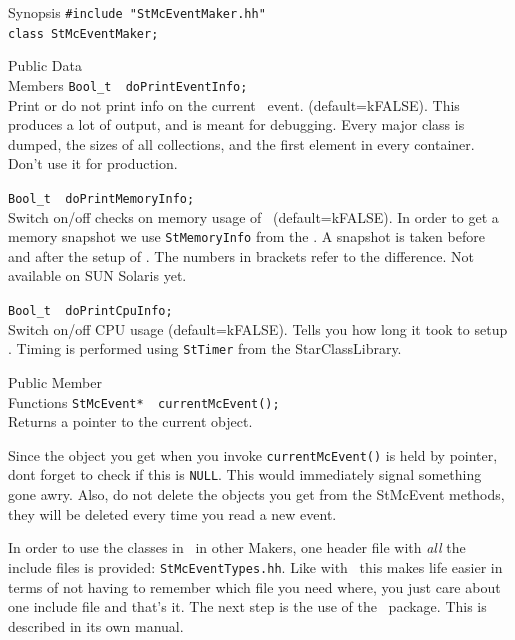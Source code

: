 \label{sec:StMcEventMaker}
\begin{Entry}
\item[Synopsis]
    \verb+#include "StMcEventMaker.hh"+\\
    \verb+class StMcEventMaker;+\\

\item[Public Data\\ Members]
    \verb+Bool_t  doPrintEventInfo;+\\
    Print or do not print info on the current \StMcEvent\ event.
    (default=kFALSE).  This produces a lot of output, and is
    meant for debugging.  Every major
    class is dumped, the sizes of all collections, and the first
    element in every container. Don't use it for production.
    
    \verb+Bool_t  doPrintMemoryInfo;+\\
    Switch on/off checks on memory usage of \StMcEvent\
    (default=kFALSE).  In order to get a memory snapshot we use
    \texttt{StMemoryInfo} from the .  A
    snapshot is taken before and after the setup of \StEvent.  The
    numbers in brackets refer to the difference. Not available on SUN
    Solaris yet.
    
    \verb+Bool_t  doPrintCpuInfo;+\\
    Switch on/off CPU usage (default=kFALSE). Tells you how long it
    took to setup \StEvent. Timing is performed using \texttt{StTimer}
    from the StarClassLibrary.

\item[Public Member\\ Functions]
    \verb+StMcEvent*  currentMcEvent();+\\
    Returns a pointer to the current  object.
\end{Entry}

Since the  object you get when you invoke
{\tt currentMcEvent()} is held by pointer, dont forget to
check if this is {\tt NULL}. This would immediately signal
something gone awry.  Also, do not delete the objects
you get from the StMcEvent methods, they will be deleted
every time you read a new event.

In order to use the classes in
\StMcEvent\ in other Makers, one header file with {\it all} the include files
is provided: {\tt StMcEventTypes.hh}. \index{StMcEventTypes}
Like with \StEvent\ this makes
life easier in terms of not having to remember which file you need where,
you just care about one include file and that's it.  
The next step is the use of the \StAssociationMaker\ package.  This is described
in its own manual.

